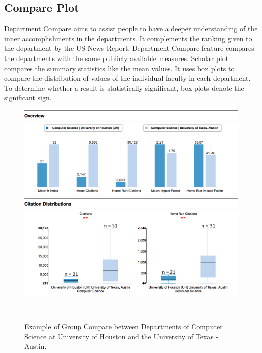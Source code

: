 \subsection{Compare Plot}








Department Compare aims to assist people to have a deeper understanding of the inner accomplishments in the departments. It complements the ranking given to the department by the US News Report. Department Compare feature compares the departments with the same publicly available measures. Scholar plot compares the summary statistics like the mean values. It uses box plots to compare the distribution of values of the individual faculty in each department. To determine whether a result is statistically significant, box plots denote the significant sign.

\begin{figure}
  \centering
  \includegraphics[width=1\textwidth]{figures/fig-GroupCompare-HD}
  \includegraphics[width=1\textwidth]{figures/fig-GroupCompare-HD2}
  \caption{Example of Group Compare between Departments of Computer Science at University of Houston and the University of Texas - Austin.}~\label{fig:groupcompare}
\end{figure}







